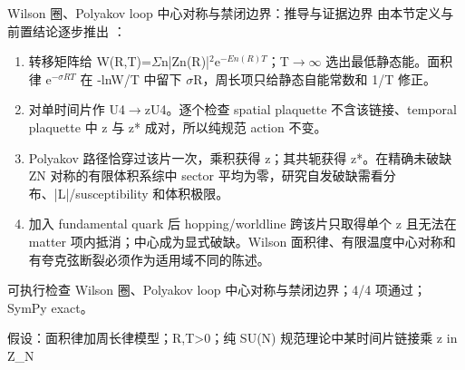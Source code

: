 \begin{frame}[t]{Wilson 圈、Polyakov loop 中心对称与禁闭边界：推导与证据边界}
\footnotesize
{}\quad 由本节定义与前置结论逐步推出 ：
\begin{enumerate}
\item 转移矩阵给 W(R,T)=\ensuremath{\Sigma}n|Zn(R)|\ensuremath{^{2}}e\ensuremath{^{-En(R)T}}；T\ensuremath{\rightarrow}\ensuremath{\infty} 选出最低静态能。面积律 e\ensuremath{^{-\sigma{}RT}} 在 -lnW/\allowbreak{}T 中留下 \ensuremath{\sigma}R，周长项只给静态自能常数和 1/\allowbreak{}T 修正。
\item 对单时间片作 U4\ensuremath{\rightarrow}zU4。逐个检查 spatial plaquette 不含该链接、temporal plaquette 中 z 与 z* 成对，所以纯规范 action 不变。
\item Polyakov 路径恰穿过该片一次，乘积获得 z；其共轭获得 z*。在精确未破缺 ZN 对称的有限体积系综中 sector 平均为零，研究自发破缺需看分布、|L|/\allowbreak{}susceptibility 和体积极限。
\item 加入 fundamental quark 后 hopping/\allowbreak{}worldline 跨该片只取得单个 z 且无法在 matter 项内抵消；中心成为显式破缺。Wilson 面积律、有限温度中心对称和有夸克弦断裂必须作为适用域不同的陈述。
\end{enumerate}\begin{block}{可执行检查}
\quad Wilson 圈、Polyakov loop 中心对称与禁闭边界；4/4 项通过；SymPy exact。
\par\scriptsize 假设：面积律加周长律模型；R,T>0；纯 SU(N) 规范理论中某时间片链接乘 z in Z\_N
\end{block}
\end{frame}

